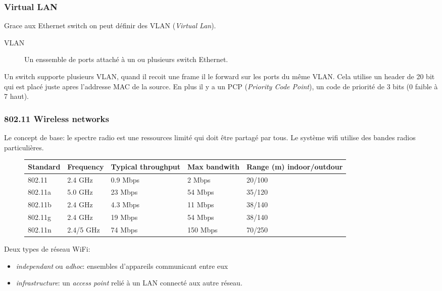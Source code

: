 \subsubsection{Virtual LAN}

Grace aux Ethernet switch on peut définir des VLAN (\textit{Virtual Lan}). 
\begin{description}
\item[VLAN] Un enssemble de ports attaché à un ou plusieurs switch Ethernet.
\end{description}

Un switch supporte plusieurs VLAN, quand il recoit une frame il le forward sur les ports du même VLAN. Cela utilise un header de 20 bit qui est placé juste apres l'addresse MAC de la source. En plus il y a un PCP (\textit{Priority Code Point}), un code de priorité de 3 bits (0 faible à 7 haut). 


\subsubsection{802.11 Wireless networks}

Le concept de base: le spectre radio est une ressources limité qui doit être partagé par tous. Le système wifi utilise des bandes radios particulières.

\begin{figure}[H]
\begin{tabular}{|l|l|l|l|l|}
\hline
Standard & Frequency & Typical throughput & Max bandwith & Range (m) indoor/outdour\\
\hline
802.11  &   2.4 GHz & 0.9 Mbps &   2 Mbps & 20/100 \\
802.11a &   5.0 GHz & 23  Mbps &  54 Mbps & 35/120 \\
802.11b &   2.4 GHz & 4.3 Mbps &  11 Mbps & 38/140 \\
802.11g &   2.4 GHz & 19  Mbps &  54 Mbps & 38/140 \\
802.11n & 2.4/5 GHz & 74  Mbps & 150 Mbps & 70/250 \\
\hline
\end{tabular}
\end{figure}

% 

Deux types de réseau WiFi:
\begin{itemize}
\item \textit{independant} ou \textit{adhoc}: ensembles d'appareils communicant entre eux
\item \textit{infrastructure}: un \textit{access point} relié à un LAN connecté aux autre réseau.
\end{itemize}

